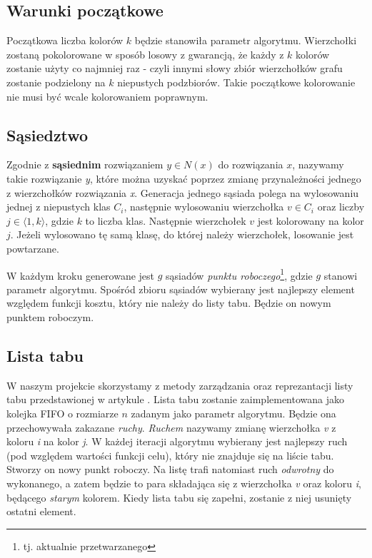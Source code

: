 \documentclass[12pt,a4paper]{article}
\begin{document}
\subsection{Warunki początkowe}
Początkowa liczba kolorów $k$ będzie stanowiła parametr algorytmu. Wierzchołki zostaną pokolorowane w sposób losowy z gwarancją, że każdy z $k$ kolorów zostanie użyty co najmniej raz - czyli innymi słowy zbiór wierzchołków grafu zostanie podzielony na $k$ niepustych podzbiorów. Takie początkowe kolorowanie nie musi być wcale kolorowaniem poprawnym.


\subsection{Sąsiedztwo}
Zgodnie z \cite{coloring} \textbf{sąsiednim} rozwiązaniem $y\in N(x)$ do rozwiązania $x$, nazywamy takie rozwiązanie \textit{y}, które można uzyskać poprzez zmianę przynależności jednego z wierzchołków rozwiązania \textit{x}. Generacja jednego sąsiada polega na wylosowaniu jednej z niepustych klas $C_i$, następnie wylosowaniu wierzchołka $v\in C_i$ oraz liczby $j\in\langle1,k\rangle$, gdzie $k$ to liczba klas. Następnie wierzchołek $v$ jest kolorowany na kolor $j$. Jeżeli wylosowano tę samą klasę, do której należy wierzchołek, losowanie jest powtarzane.

W każdym kroku generowane jest $g$ sąsiadów \textit{punktu roboczego}\footnote{tj. aktualnie przetwarzanego}, gdzie $g$ stanowi parametr algorytmu. Spośród zbioru sąsiadów wybierany jest najlepszy element względem funkcji kosztu, który nie należy do listy tabu. Będzie on nowym punktem roboczym.

\subsection{Lista tabu}
W naszym projekcie skorzystamy z metody zarządzania oraz reprezantacji listy tabu przedstawionej w artykule \cite{Hertz1987}. Lista tabu zostanie zaimplementowana jako kolejka FIFO o rozmiarze $n$ zadanym jako parametr algorytmu. Będzie ona przechowywała zakazane \textit{ruchy}. \textit{Ruchem} nazywamy zmianę wierzchołka \textit{v} z koloru \textit{i} na kolor \textit{j}. W każdej iteracji algorytmu wybierany jest najlepszy ruch (pod względem wartości funkcji celu), który nie znajduje się na liście tabu. Stworzy on nowy punkt roboczy. Na listę trafi natomiast ruch \textit{odwrotny} do wykonanego, a zatem będzie to para składająca się z wierzchołka \textit{v} oraz koloru \textit{i}, będącego \textit{starym} kolorem. Kiedy lista tabu się zapełni, zostanie z niej usunięty ostatni element.
\end{document}
